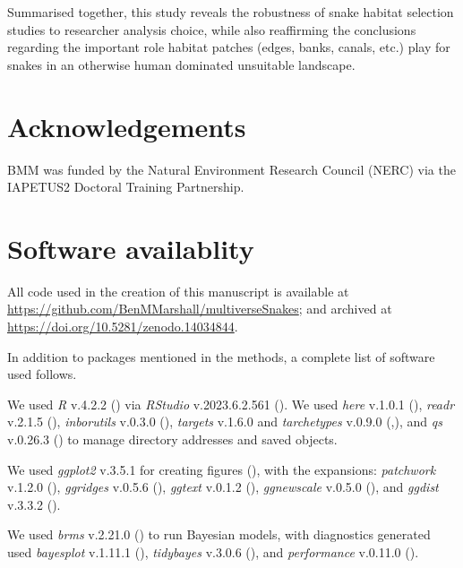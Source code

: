 \documentclass[10pt,a4paper]{article}
\begin{document}
Summarised together, this study reveals the robustness of snake habitat selection studies to researcher analysis choice, while also reaffirming the conclusions regarding the important role habitat patches (edges, banks, canals, etc.) play for snakes in an otherwise human dominated unsuitable landscape.

\section{Acknowledgements}\label{acknowledgements}

BMM was funded by the Natural Environment Research Council (NERC) via the IAPETUS2 Doctoral Training Partnership.

\section{Software availablity}\label{software-availablity}

All code used in the creation of this manuscript is available at \url{https://github.com/BenMMarshall/multiverseSnakes}; and archived at \url{https://doi.org/10.5281/zenodo.14034844}.

In addition to packages mentioned in the methods, a complete list of software used follows.

We used \emph{R} v.4.2.2 () via \emph{RStudio} v.2023.6.2.561 ().
We used \emph{here} v.1.0.1 (), \emph{readr} v.2.1.5 (), \emph{inborutils} v.0.3.0 (),
\emph{targets} v.1.6.0 and \emph{tarchetypes} v.0.9.0 (,), and \emph{qs} v.0.26.3 () to manage directory addresses and saved objects.

We used \emph{ggplot2} v.3.5.1 for creating figures (), with the expansions: \emph{patchwork} v.1.2.0 (), \emph{ggridges} v.0.5.6 (), \emph{ggtext} v.0.1.2 (), \emph{ggnewscale} v.0.5.0 (), and \emph{ggdist} v.3.3.2 ().

We used \emph{brms} v.2.21.0 () to run Bayesian models, with diagnostics generated used \emph{bayesplot} v.1.11.1 (), \emph{tidybayes} v.3.0.6 (), and \emph{performance} v.0.11.0 ().
\end{document}
